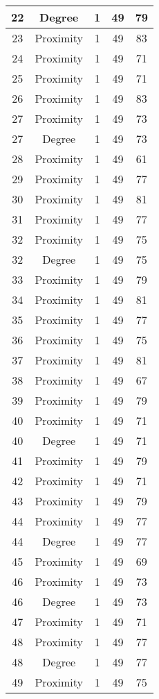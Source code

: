 \documentclass[results.tex]{subfiles}
\begin{document}
\begin{center}
\begin{tabular}{| c || c | c | c | c |}
    \hline
    22 & Degree & 1 & 49 & 79 \\ 
    \hline
    23 & Proximity & 1 & 49 & 83 \\ 
    \hline
    24 & Proximity & 1 & 49 & 71 \\ 
    \hline
    25 & Proximity & 1 & 49 & 71 \\ 
    \hline
    26 & Proximity & 1 & 49 & 83 \\ 
    \hline
    27 & Proximity & 1 & 49 & 73 \\ 
    \hline
    27 & Degree & 1 & 49 & 73 \\ 
    \hline
    28 & Proximity & 1 & 49 & 61 \\ 
    \hline
    29 & Proximity & 1 & 49 & 77 \\ 
    \hline
    30 & Proximity & 1 & 49 & 81 \\ 
    \hline
    31 & Proximity & 1 & 49 & 77 \\ 
    \hline
    32 & Proximity & 1 & 49 & 75 \\ 
    \hline
    32 & Degree & 1 & 49 & 75 \\ 
    \hline
    33 & Proximity & 1 & 49 & 79 \\ 
    \hline
    34 & Proximity & 1 & 49 & 81 \\ 
    \hline
    35 & Proximity & 1 & 49 & 77 \\ 
    \hline
    36 & Proximity & 1 & 49 & 75 \\ 
    \hline
    37 & Proximity & 1 & 49 & 81 \\ 
    \hline
    38 & Proximity & 1 & 49 & 67 \\ 
    \hline
    39 & Proximity & 1 & 49 & 79 \\ 
    \hline
    40 & Proximity & 1 & 49 & 71 \\ 
    \hline
    40 & Degree & 1 & 49 & 71 \\ 
    \hline
    41 & Proximity & 1 & 49 & 79 \\ 
    \hline
    42 & Proximity & 1 & 49 & 71 \\ 
    \hline
    43 & Proximity & 1 & 49 & 79 \\ 
    \hline
    44 & Proximity & 1 & 49 & 77 \\ 
    \hline
    44 & Degree & 1 & 49 & 77 \\ 
    \hline
    45 & Proximity & 1 & 49 & 69 \\ 
    \hline
    46 & Proximity & 1 & 49 & 73 \\ 
    \hline
    46 & Degree & 1 & 49 & 73 \\ 
    \hline
    47 & Proximity & 1 & 49 & 71 \\ 
    \hline
    48 & Proximity & 1 & 49 & 77 \\ 
    \hline
    48 & Degree & 1 & 49 & 77 \\ 
    \hline
    49 & Proximity & 1 & 49 & 75 \\ 
    \hline   \end{tabular}
\end{center}
\end{document}

